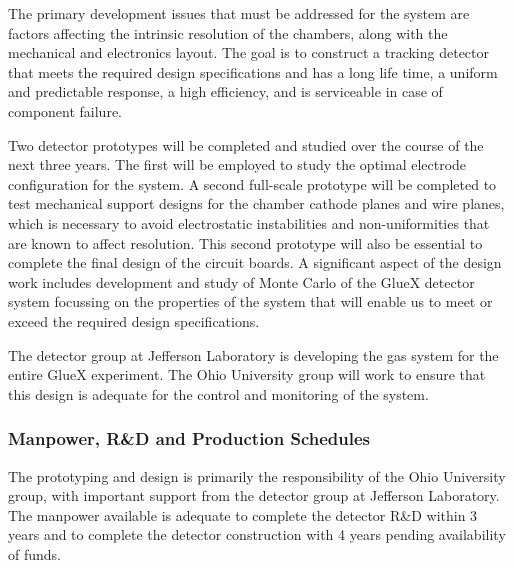 The primary development issues that must be addressed for the \fdc{} system
are factors affecting the intrinsic resolution of the chambers, along with 
the mechanical and electronics layout.  The goal is to construct a tracking 
detector that meets the required design specifications and has a long life 
time, a uniform and predictable response, a high efficiency, and is 
serviceable in case of component failure.

Two detector prototypes will be completed and studied over the course
of the next three years.  The first will be employed to study the optimal 
electrode configuration for the system.  A second full-scale prototype
will be completed to test mechanical support designs for the chamber 
cathode planes and wire planes, which is necessary to avoid electrostatic 
instabilities and non-uniformities that are known to affect resolution. 
This second prototype will also be essential to complete the final design 
of the \fdc{} circuit boards.  A significant aspect of the design work includes 
development and study of Monte Carlo of the GlueX detector system focussing 
on the properties of the \fdc{} system that will enable us to meet or exceed 
the required design specifications.

The detector group at Jefferson Laboratory is developing the gas system
for the entire GlueX experiment.  The Ohio University group will work
to ensure that this design is adequate for the control and monitoring
of the \fdc{} system.

\subsubsection*{Manpower, R\&D and Production Schedules}

The \fdc{} prototyping and design is primarily the responsibility of
the Ohio University group, with important support from the detector
group at Jefferson Laboratory.  The manpower available is adequate
to complete the detector R\&D within 3 years and to complete the
detector construction with 4 years pending availability of funds.


